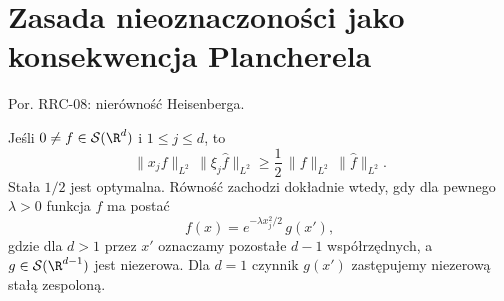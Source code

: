 \setcounter{section}{29}
\section{Zasada nieoznaczoności jako konsekwencja Plancherela}
\label{sec:dt-uncertainty}
\providecommand{\atlasref}[2]{#2}

Por. \atlasref{PDE-08::thm:pde8-uncertainty}{RRC-08: nierówność Heisenberga}.


\begin{twierdzenie}
\label{thm:dt-uncertainty}
Jeśli $0\ne f\in\mathcal S(\R^d)$ i $1\le j\le d$, to
\[
 \|x_jf\|_{L^2}\,\|\xi_j\widehat f\|_{L^2}
 \ge\frac12\,\|f\|_{L^2}\,\|\widehat f\|_{L^2}.
\]
Stała $1/2$ jest optymalna. Równość zachodzi
dokładnie wtedy, gdy dla pewnego $\lambda>0$
funkcja $f$ ma postać
\[
 f(x)=e^{-\lambda x_j^2/2}\,g(x'),
\]
gdzie dla $d>1$ przez $x'$ oznaczamy pozostałe
$d-1$ współrzędnych, a $g\in\mathcal S(\R^{d-1})$
jest niezerowa. Dla $d=1$ czynnik $g(x')$
zastępujemy niezerową stałą zespoloną.
\end{twierdzenie}
